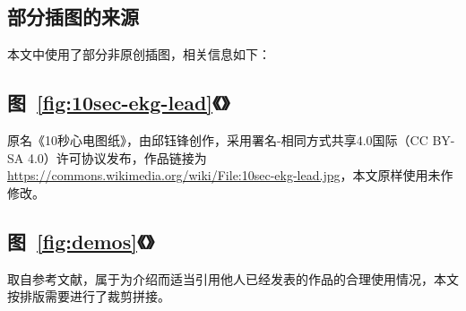 \begin{appendix}

    \begingroup
    \renewcommand{\clearpage}{\relax}
    \listoftodos
    \endgroup

    \listoffigures
    \listoffigureEng


    \chapter*{部分插图的来源}\label{ch:license}

    本文中使用了部分非原创插图，相关信息如下：

    \section*{图~\ref{fig:10sec-ekg-lead}《》}

    原名《10秒心电图纸》，由邱钰锋创作，采用署名-相同方式共享4.0国际（CC BY-SA 4.0）许可协议发布，作品链接为 \url{https://commons.wikimedia.org/wiki/File:10sec-ekg-lead.jpg}，本文原样使用未作修改。

    \section*{图~\ref{fig:demos}《》}

    取自参考文献\cite{chenJiyushenduxuexidexindianfenximoxingdeshejiyuyouhua2021,liuJiyuyidongzhongduanfenxidekechuandairouxingxindianjiancexitong2021,jinPredictingCardiovascularDisease2009}，属于为介绍而适当引用他人已经发表的作品的合理使用情况，本文按排版需要进行了裁剪拼接。

\end{appendix}
